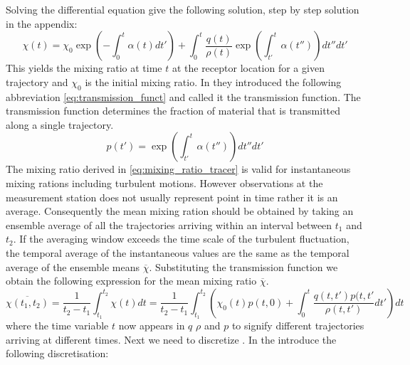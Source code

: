 Solving the differential equation give the following solution, step by step solution in the appendix:
\begin{equation}\label{eq:mixing_ratio_tracer}
    \chi(t) = \chi_0 \exp{\left(-\int_0^t \alpha(t)dt'\right)} + \int_0^t \frac{q(t)}{\rho(t)}\exp{\left(\int_{t'}^t\alpha(t'')\right)dt''}dt'
\end{equation}
This yields the mixing ratio at time $t$ at the receptor location for a given trajectory and $\chi_0$ is the initial mixing ratio. In \parencite{seibert2004source} they introduced the following abbreviation \cref{eq:transmission_funct} and called it the transmission function. The transmission function determines the fraction of material that is transmitted along a single trajectory.   
\begin{equation}\label{eq:transmission_funct}
    p(t') = \exp{\left(\int_{t'}^t\alpha(t'')\right)dt''}dt'
\end{equation} 
The mixing ratio derived in \cref{eq:mixing_ratio_tracer} is valid for instantaneous mixing rations including turbulent motions. However observations at the measurement station does not usually represent point in time rather it is an average. Consequently the mean mixing ration should be obtained by taking an ensemble average of all the trajectories arriving within an interval between $t_1$ and $t_2$. If the averaging window exceeds the time scale of the turbulent fluctuation, the temporal average of the instantaneous values are the same as the temporal average of the ensemble means $\overline{\chi}$. Substituting the transmission function we obtain the following expression for the mean mixing ratio $\overline{\chi}$. 
\begin{equation}\label{eq:ensemble_mix_ratio}
    \overline{\chi(t_1, t_2)} = \frac{1}{t_2-t_1}\int_{t_1}^{t_2} \chi(t)dt = \frac{1}{t_2-t_1}\int_{t_1}^{t_2} \left(\chi_0(t)p(t,0)+\int_0^t \frac{q(t,t')p(t,t'}{\rho(t,t')}dt'\right)dt
\end{equation}
where the time variable $t$ now appears in $q$ $\rho$ and $p$ to signify different trajectories arriving at different times. Next we need to discretize . In \textcite{seibert2004source} the introduce the following discretisation:

